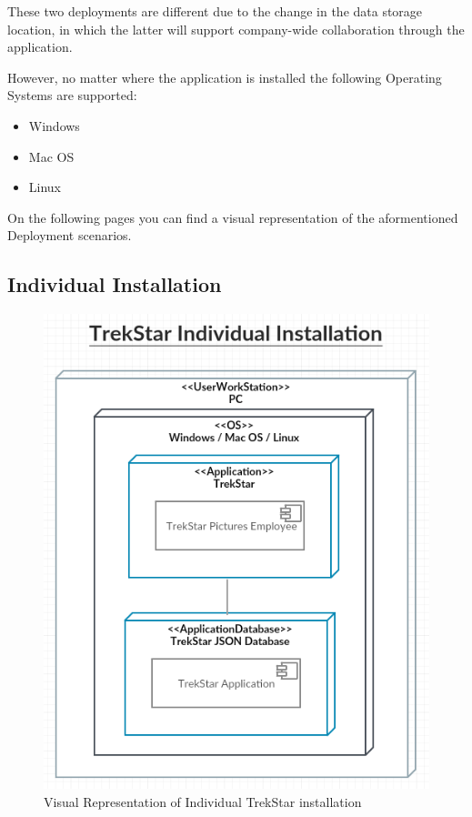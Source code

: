 \documentclass[
  english,
  a4paper,
,tablecaptionabove
]{scrartcl}
\providecommand{\tightlist}{%
  \setlength{\itemsep}{0pt}\setlength{\parskip}{0pt}}
\begin{document}
These two deployments are different due to the change in the data
storage location, in which the latter will support company-wide
collaboration through the application.

However, no matter where the application is installed the following
Operating Systems are supported:

\begin{itemize}
\tightlist
\item
  Windows
\item
  Mac OS
\item
  Linux
\end{itemize}

On the following pages you can find a visual representation of the
aformentioned Deployment scenarios.

\hypertarget{individual-installation}{%
\subsection{Individual Installation}\label{individual-installation}}

\begin{figure}
\centering
\includegraphics{deployment-diagrams/trekstar-individual-installation.png}
\caption{Visual Representation of Individual TrekStar installation}
\end{figure}
\end{document}
